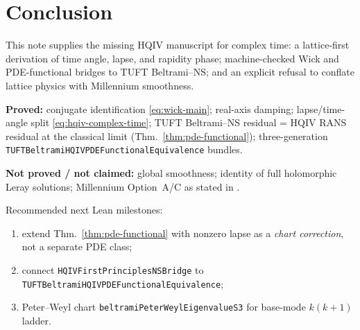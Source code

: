 \documentclass[11pt]{amsart}
\newcommand{\leanid}[1]{\nolinkurl{#1}}
\begin{document}
\begin{center}
\end{center}

\section{Conclusion}
\label{sec:conclusion}

This note supplies the missing HQIV manuscript for complex time: a lattice-first derivation of
time angle, lapse, and rapidity phase; machine-checked Wick and PDE-functional bridges to TUFT
Beltrami--NS; and an explicit refusal to conflate lattice physics with Millennium smoothness.

\textbf{Proved:} conjugate identification \eqref{eq:wick-main}; real-axis damping; lapse/time-angle
split \eqref{eq:hqiv-complex-time}; TUFT Beltrami--NS residual = HQIV RANS residual at the classical
limit (Thm.~\ref{thm:pde-functional}); three-generation
\leanid{TUFTBeltramiHQIVPDEFunctionalEquivalence} bundles.

\textbf{Not proved / not claimed:} global smoothness; identity of full holomorphic Leray solutions;
Millennium Option~A/C as stated in \cite{NielsenSemitaNS2026}.

Recommended next Lean milestones:
\begin{enumerate}[label=(\arabic*),leftmargin=2em]
\item extend Thm.~\ref{thm:pde-functional} with nonzero lapse as a \emph{chart correction}, not a
  separate PDE class;
\item connect \leanid{HQIVFirstPrinciplesNSBridge} to \leanid{TUFTBeltramiHQIVPDEFunctionalEquivalence};
\item Peter--Weyl chart \leanid{beltramiPeterWeylEigenvalueS3} for base-mode $k(k+1)$ ladder.
\end{enumerate}
\end{document}
